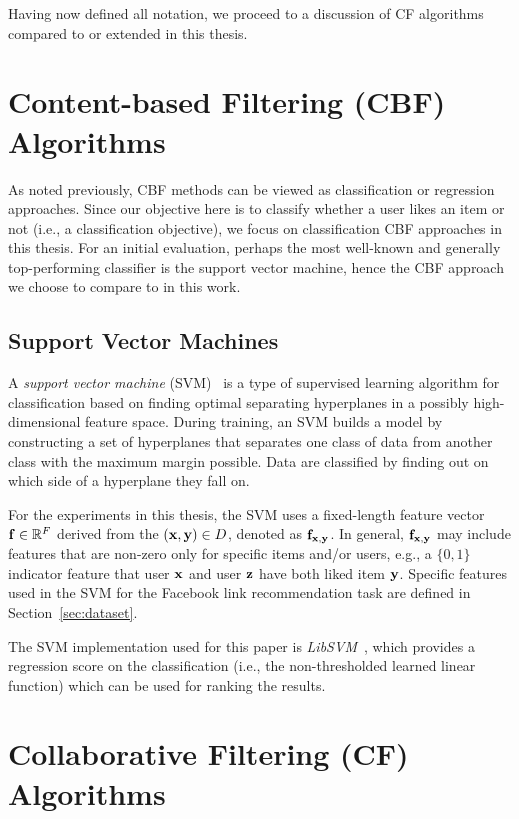 Having now defined all notation, we proceed to a discussion of
CF algorithms compared to or extended in this thesis.

\section{Content-based Filtering (CBF) Algorithms}

As noted previously, CBF methods can be viewed as classification
or regression approaches.  Since our objective here is to classify
whether a user likes an item or not (i.e., a classification objective),
we focus on classification CBF approaches in this thesis.  For
an initial evaluation, perhaps the most well-known and generally
top-performing classifier is the support vector machine, hence
the CBF approach we choose to compare to in this work.

\subsection{Support Vector Machines}

A \emph{support vector machine} (SVM)~\cite{svms} is a type of supervised
learning algorithm for classification based on finding optimal separating
hyperplanes in a possibly high-dimensional feature space.  During
training, an SVM builds a model by constructing a set of hyperplanes
that separates one class of data from another class with the maximum
margin possible.  Data are classified by finding out on which side of
a hyperplane they fall on.

For the experiments in this thesis, the SVM uses a fixed-length
feature vector $\mathbf{f} \in \mathbb{R}^F$ derived from the $(\mathbf{x},\mathbf{y}) \in D$,
denoted as $\mathbf{f}_{\mathbf{x},\mathbf{y}}$.  
In general, $\mathbf{f}_{\mathbf{x},\mathbf{y}}$ may include features that are
non-zero only for specific items and/or users, e.g., a $\{0,1\}$
indicator feature that user $\mathbf{x}$ and user $\mathbf{z}$ have both liked item
$\mathbf{y}$.  Specific features used in the SVM for the Facebook link recommendation
task are defined in Section~\ref{sec:dataset}.

The SVM implementation used for this paper is
\emph{LibSVM}~\cite{libsvm}, which provides a regression score on the
classification (i.e., the non-thresholded learned linear function) 
which can be used for ranking the results.

\section{Collaborative Filtering (CF) Algorithms}

